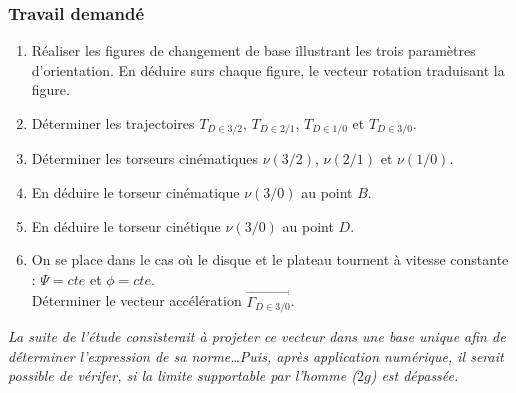 \subsubsection{Travail demandé}
\begin{enumerate}
\item Réaliser les figures de changement de base illustrant les trois paramètres d'orientation. En déduire surs chaque figure, le vecteur rotation traduisant la figure.
\item Déterminer les trajectoires $T_{D \in 3/2}$, $T_{D \in 2/1}$, $T_{D \in 1/0}$ et $T_{D \in 3/0}$.
\item Déterminer les torseurs cinématiques $\nu(3/2)$, $\nu(2/1)$ et $\nu(1/0)$.
\item En déduire le torseur cinématique $\nu(3/0)$ au point $B$.
\item En déduire le torseur cinétique $\nu(3/0)$ au point $D$.
\item On se place dans le cas où le disque et le plateau tournent à vitesse constante : $\Psi=cte$ et $\phi=cte$.\\
Déterminer le vecteur accélération $\overrightarrow{\Gamma_{D \in 3/0}}$.
\end{enumerate}
\textit{La suite de l'étude consisterait à projeter ce vecteur dans une base unique afin de déterminer l'expression de sa norme\dots Puis, après application numérique, il serait possible de vérifer, si la limite supportable par l'homme ($2g$) est dépassée.}

